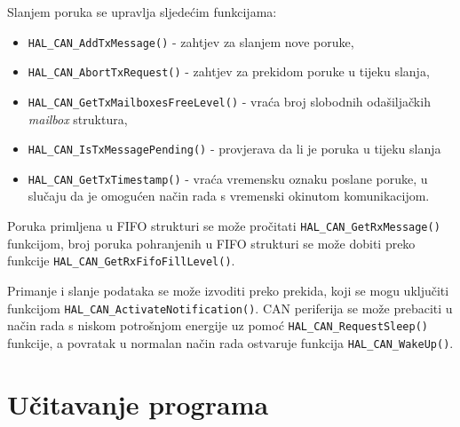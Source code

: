 Slanjem poruka se upravlja sljedećim funkcijama:
\begin{itemize}
	\item \verb|HAL_CAN_AddTxMessage()| - zahtjev za slanjem nove poruke,
	\item \verb|HAL_CAN_AbortTxRequest()| - zahtjev za prekidom poruke u tijeku slanja,
	\item \verb|HAL_CAN_GetTxMailboxesFreeLevel()| - vraća broj slobodnih odašiljačkih \textit{mailbox} struktura,
	\item \verb|HAL_CAN_IsTxMessagePending()| - provjerava da li je poruka u tijeku slanja
	\item \verb|HAL_CAN_GetTxTimestamp()| - vraća vremensku oznaku poslane poruke, u slučaju da je omogućen način rada s vremenski okinutom komunikacijom.
\end{itemize}
\noindent Poruka primljena u FIFO strukturi se može pročitati \verb|HAL_CAN_GetRxMessage()| funkcijom, broj poruka pohranjenih u FIFO strukturi se može dobiti preko funkcije \verb|HAL_CAN_GetRxFifoFillLevel()|.

Primanje i slanje podataka se može izvoditi preko prekida, koji se mogu uključiti funkcijom \verb|HAL_CAN_ActivateNotification()|. CAN periferija se može prebaciti u način rada s niskom potrošnjom energije uz pomoć \verb|HAL_CAN_RequestSleep()| funkcije, a povratak u normalan način rada ostvaruje funkcija \verb|HAL_CAN_WakeUp()|.

\section{Učitavanje programa}

